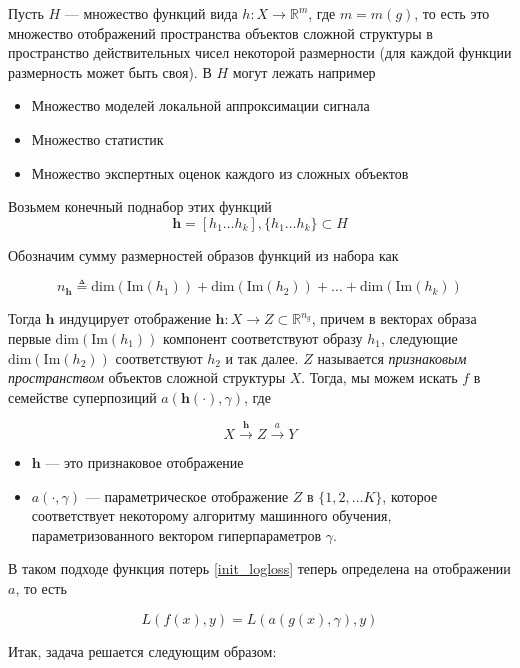 \documentclass[12pt,fleqn,unicode]{article}
\newcommand{\bh}{\mathbf{h}}
\newcommand{\R}{\mathbb{R}}
\begin{document}
Пусть $H$ --- множество функций вида
$h: X \to \R^m$, где $m = m(g)$, то есть это множество отображений
пространства объектов сложной структуры в пространство действительных чисел
некоторой размерности (для каждой функции размерность может быть своя). В
$H$ могут лежать например

\begin{itemize}
    \item Множество моделей локальной аппроксимации сигнала
    \item Множество статистик
    \item Множество экспертных оценок каждого из сложных объектов
\end{itemize}

Возьмем конечный поднабор этих функций
$$
\bh = [h_1\ldots h_k], \{h_1\ldots h_k\} \subset H
$$

Обозначим сумму размерностей образов функций из набора как

$$
n_\bh \triangleq \mathrm{dim}(\mathrm{Im}(h_1)) +
\mathrm{dim}(\mathrm{Im}(h_2)) + \ldots +
\mathrm{dim}(\mathrm{Im}(h_k))
$$

Тогда $\bh$ индуцирует отображение $\bh: X \to Z \subset \R^{n_g}$,
причем в векторах образа первые $\mathrm{dim}(\mathrm{Im}(h_1))$ компонент соответствуют
образу $h_1$, следующие $\mathrm{dim}(\mathrm{Im}(h_2))$ соответствуют $h_2$
и так далее. $Z$ называется \textit{признаковым пространством}
объектов сложной структуры $X$. Тогда, мы можем искать $f$ в семействе
суперпозиций $a(\bh(\cdot), \gamma)$, где

$$
X \xrightarrow{\bh} Z \xrightarrow{a} Y
$$

\begin{itemize}
    \item $\bh$ --- это признаковое отображение
    \item $a(\cdot, \gamma)$ --- параметрическое отображение $Z$ в $\{1, 2, \ldots K\}$,
    которое соответствует некоторому алгоритму машинного обучения,
    параметризованного вектором гиперпараметров $\gamma$.
\end{itemize}

В таком подходе функция потерь \ref{init_logloss} теперь определена
на отображении $a$, то есть

$$
L(f(x), y) = L(a(g(x), \gamma), y)
$$

Итак, задача решается следующим образом:
\end{document}
